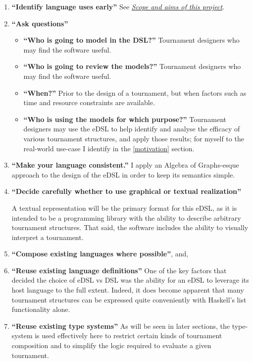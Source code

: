 \documentclass[a4,11pt,twoside,final,hidelinks]{article}
\begin{document}
\begin{enumerate}
\item \textbf{``Identify language uses early''}
See \hyperref[aims]{\emph{Scope and aims of this project}}.

\item \textbf{``Ask questions''}
\begin{itemize}
\item \textbf{``Who is going to model in the DSL?''} Tournament designers who may find the
software useful.

\item \textbf{``Who is going to review the models?''} Tournament designers who may find
the software useful.

\item \textbf{``When?''} Prior to the design of a tournament, but when factors such as time
and resource constraints are available.

\item \textbf{``Who is using the models for which purpose?''} Tournament designers may use
the eDSL to help identify and analyse the efficacy of various tournament
structures, and apply those results; for myself to the real-world use-case
I identify in the \ref{motivation} section.
\end{itemize}

\item \textbf{``Make your language consistent.''} I apply an Algebra of Graphs-esque approach
to the design of the eDSL in order to keep its semantics simple.

\item \textbf{``Decide carefully whether to use graphical or textual realization''}

A textual representation will be the primary format for this eDSL, as it is
intended to be a programming library with the ability to describe arbitrary
tournament structures. That said, the software includes the ability to
visually interpret a tournament.

\item \textbf{``Compose existing languages where possible''}, and,
\item \textbf{``Reuse existing language definitions''} One of the key factors that decided the
choice of eDSL vs DSL was the ability for an eDSL to leverage its host
language to the full extent. Indeed, it does become apparent that many
tournament structures can be expressed quite conveniently with Haskell's list
functionality alone.

\item \textbf{``Reuse existing type systems''} As will be seen in later sections, the
type-system is used effectively here to restrict certain kinds of tournament
composition and to simplify the logic required to evaluate a given
tournament.
\end{enumerate}
\end{document}
